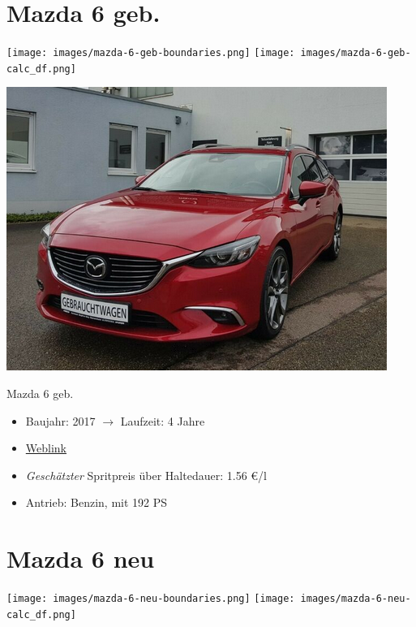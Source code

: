 \documentclass[landscape, DIV=99, 14pt]{scrartcl}
\begin{document}
\pagebreak


\twocolumn

\section*{Mazda 6 geb.}
\begin{center}
\texttt{[image: images/mazda-6-geb-boundaries.png]}
\null
\vspace{0.5cm}
\texttt{[image: images/mazda-6-geb-calc\_df.png]}
\end{center}

\pagebreak
\null
\vspace{2cm}
\begin{center}
\includegraphics[width=0.9\columnwidth]{cars/mazda-6-alt.png}

Mazda 6 geb.
\end{center}

\begin{itemize}
    \item Baujahr: 2017 $\rightarrow$ Laufzeit: 4 Jahre
    \item \href{https://suchen.mobile.de/fahrzeuge/details.html?action=parkItem&id=332186075}{Weblink}
    \item \emph{Gesch\"atzter} Spritpreis \"uber Haltedauer: 1.56 \euro{}/l
    \item Antrieb: Benzin, mit 192 PS
\end{itemize}

\pagebreak


\twocolumn

\section*{Mazda 6 neu}
\begin{center}
\texttt{[image: images/mazda-6-neu-boundaries.png]}
\null
\vspace{0.5cm}
\texttt{[image: images/mazda-6-neu-calc\_df.png]}
\end{center}
\end{document}
